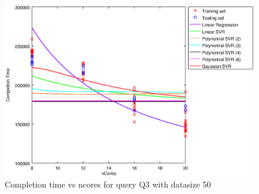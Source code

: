 
\begin {figure}[hbtp]
\centering
\includegraphics[width=\textwidth]{output/Q3_50_ALL_WITH_1_OVER_NCORES/plot_Q3_50.eps}
\caption{Completion time vs ncores for query Q3 with datasize 50}
\label{fig:all_linear_Q3_50}
\end {figure}
